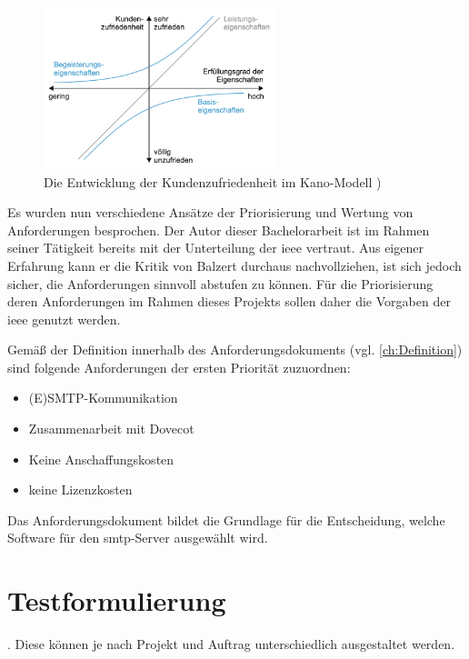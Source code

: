 \begin{figure}[H]
  \centering
  \includegraphics[width=0.6\textwidth]{res/kano.png}
  \caption{Die Entwicklung der Kundenzufriedenheit im Kano-Modell \citep[][545]{Balzert2010})}
  \label{fig:Kanomodell}
\end{figure}

Es wurden nun verschiedene Ansätze der Priorisierung und Wertung von Anforderungen besprochen. Der Autor dieser Bachelorarbeit ist im Rahmen seiner Tätigkeit bereits mit der Unterteilung der \ac{ieee} vertraut. Aus eigener Erfahrung kann er die Kritik von Balzert durchaus nachvollziehen, ist sich jedoch sicher, die Anforderungen sinnvoll abstufen zu können. Für die Priorisierung deren Anforderungen im Rahmen dieses Projekts sollen daher die Vorgaben der \ac{ieee} genutzt werden.

Gemäß der Definition innerhalb des Anforderungsdokuments (vgl. \autoref{ch:Definition}) sind folgende Anforderungen der ersten Priorität zuzuordnen:
\begin{itemize}
	\item (E)SMTP-Kommunikation
	\item Zusammenarbeit mit Dovecot
	\item Keine Anschaffungskosten
	\item keine Lizenzkosten
\end{itemize}

Das Anforderungsdokument bildet die Grundlage für die Entscheidung, welche Software für den \ac{smtp}-Server ausgewählt wird.

\section{Testformulierung}

 \citep[][266]{Sommerville2012}. 
Diese können je nach Projekt und Auftrag unterschiedlich ausgestaltet werden.  

